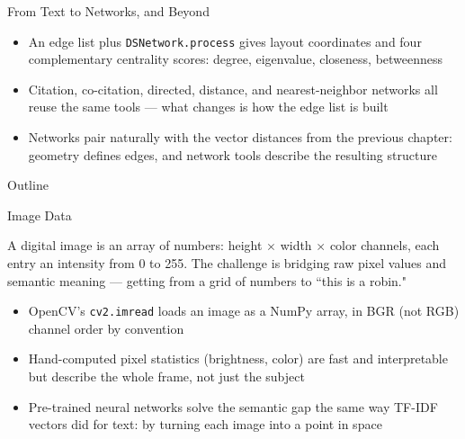 \documentclass[8pt,aspectratio=169]{beamer}
\begin{document}
\begin{textframe}{From Text to Networks, and Beyond}

\begin{itemize}
\item An edge list plus \texttt{DSNetwork.process} gives layout coordinates and four complementary centrality scores: degree, eigenvalue, closeness, betweenness
\item Citation, co-citation, directed, distance, and nearest-neighbor networks all reuse the same tools --- what changes is how the edge list is built
\item Networks pair naturally with the vector distances from the previous chapter: geometry defines edges, and network tools describe the resulting structure
\end{itemize}

\end{textframe}

\begin{outlineframe}{Outline}
\end{outlineframe}

\begin{textframe}{Image Data}

A digital image is an array of numbers: height $\times$ width $\times$ color channels, each entry an intensity from 0 to 255. The challenge is bridging raw pixel values and semantic meaning --- getting from a grid of numbers to ``this is a robin."

\begin{itemize}
\item OpenCV's \texttt{cv2.imread} loads an image as a NumPy array, in BGR (not RGB) channel order by convention
\item Hand-computed pixel statistics (brightness, color) are fast and interpretable but describe the whole frame, not just the subject
\item Pre-trained neural networks solve the semantic gap the same way TF-IDF vectors did for text: by turning each image into a point in space
\end{itemize}

\end{textframe}
\end{document}
